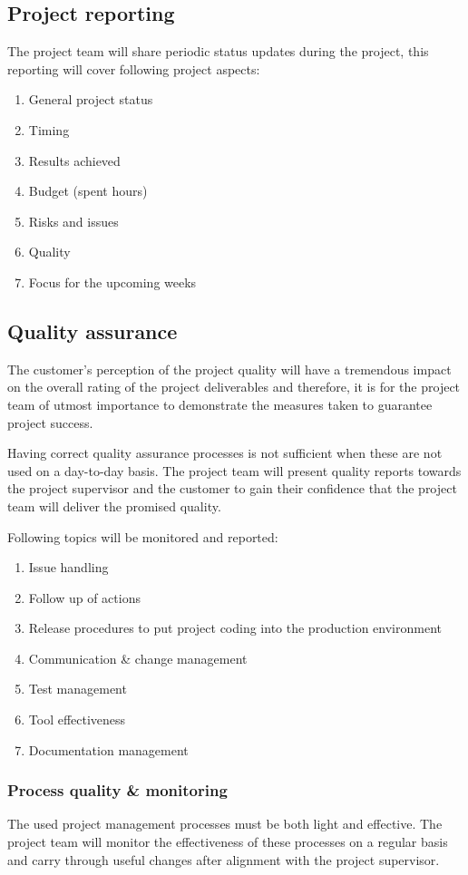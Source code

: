 \subsection{Project reporting}
The project team will share periodic status updates during the project, this reporting will cover following project aspects:
\begin{enumerate}
	\item General project status
	\item Timing
	\item Results achieved
	\item Budget (spent hours)
	\item Risks and issues
	\item Quality
	\item Focus for the upcoming weeks
\end {enumerate}

\subsection{Quality assurance}
The customer's perception of the project quality will have a tremendous impact on the overall rating of the project deliverables and therefore, it is for the project team of utmost importance to demonstrate the measures taken to guarantee project success.

Having correct quality assurance processes is not sufficient when these are not used on a day-to-day basis.
The project team will present quality reports towards the project supervisor and the customer to gain their confidence that the project team will deliver the promised quality.

Following topics will be monitored and reported: 
\begin{enumerate}
	\item Issue handling
	\item Follow up of actions
	\item Release procedures to put project coding into the production environment
	\item Communication \& change management
	\item Test management
	\item Tool effectiveness
	\item Documentation management
\end {enumerate}

\subsubsection{Process quality \& monitoring}
The used project management processes must be both light and effective.
The project team will monitor the effectiveness of these processes on a regular basis and carry through useful changes after alignment with the project supervisor.

